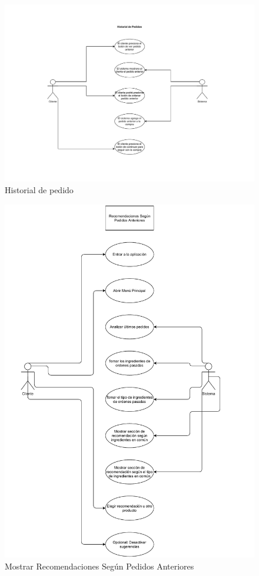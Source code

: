 \documentclass[conference]{IEEEtran}
\begin{document}
\begin{figure}[H]
\centering
\includegraphics[scale=0.24]{imagenes/Caso de uso 5.pdf}
\caption{Historial de pedido}
\end{figure}

\begin{figure}[H]
\centering
\includegraphics[scale=0.24]{imagenes/Requerimiento 6 (1).pdf}
\caption{Mostrar Recomendaciones Según Pedidos Anteriores}
\end{figure}
\end{document}

